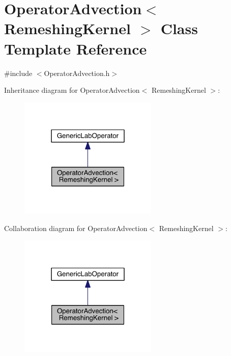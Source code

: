 \hypertarget{class_operator_advection}{}\section{Operator\+Advection$<$ Remeshing\+Kernel $>$ Class Template Reference}
\label{class_operator_advection}


{\ttfamily \#include $<$Operator\+Advection.\+h$>$}



Inheritance diagram for Operator\+Advection$<$ Remeshing\+Kernel $>$\+:\nopagebreak
\begin{figure}[H]
\begin{center}
\leavevmode
\includegraphics[width=187pt]{d6/dfd/class_operator_advection__inherit__graph}
\end{center}
\end{figure}


Collaboration diagram for Operator\+Advection$<$ Remeshing\+Kernel $>$\+:\nopagebreak
\begin{figure}[H]
\begin{center}
\leavevmode
\includegraphics[width=187pt]{df/df4/class_operator_advection__coll__graph}
\end{center}
\end{figure}
